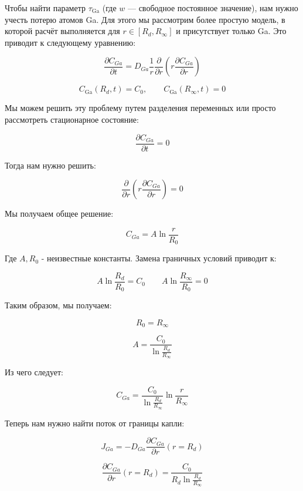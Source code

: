 \documentclass[14pt,oneside]{extarticle}
\begin{document}
Чтобы найти параметр $\tau_{\text{Ga}}$ (где $w$ — свободное постоянное значение), нам нужно учесть потерю атомов Ga. Для этого мы рассмотрим более простую модель, в которой расчёт выполняется для $r \in [R_{d}, R_{\infty}]$ и присутствует только Ga. Это приводит к следующему уравнению:

\begin{equation}
\frac{\partial C_{Ga}}{\partial t}=D_{Ga}\frac{1}{r}\frac{\partial}{\partial r}\left(r\frac{\partial C_{Ga}}{\partial r}\right)
\end{equation}

\[
C_{\text{Ga}}\left(R_d, t\right) = C_0,
\qquad
C_{\text{Ga}}\left(R_\infty, t\right) = 0
\]

Мы можем решить эту проблему путем разделения переменных или просто рассмотреть стационарное состояние:

\[
\frac{\partial C_{Ga}}{\partial t}=0
\]

Тогда нам нужно решить:

\[
\frac{\partial}{\partial r}\left(r\frac{\partial C_{Ga}}{\partial r}\right)=0
\]

Мы получаем общее решение:

\[
C_{Ga}=A\ln\frac{r}{R_{0}}
\]

Где $A,R_{0}$ - неизвестные константы. Замена граничных условий приводит к:

\[
A\ln\frac{R_{d}}{R_{0}}=C_{0}
\qquad
A\ln\frac{R_{\infty}}{R_{0}}=0
\]

Таким образом, мы получаем:

\[
R_{0}=R_{\infty}
\]

\begin{equation}
A=\frac{C_{0}}{\ln\frac{R_{d}}{R_{\infty}}}
\end{equation}

Из чего следует:

\begin{equation}
C_{Ga}=\frac{C_{0}}{\ln\frac{R_{d}}{R_{\infty}}}\ln\frac{r}{R_{\infty}}
\end{equation}

Теперь нам нужно найти поток от границы капли:

\begin{equation}
J_{Ga}=-D_{Ga}\frac{\partial C_{Ga}}{\partial r}\left(r=R_{d}\right)
\end{equation}

\begin{equation}
\frac{\partial C_{Ga}}{\partial r}\left(r=R_{d}\right)=\frac{C_{0}}{R_{d}\ln\frac{R_{d}}{R_{\infty}}}
\end{equation}
\end{document}
